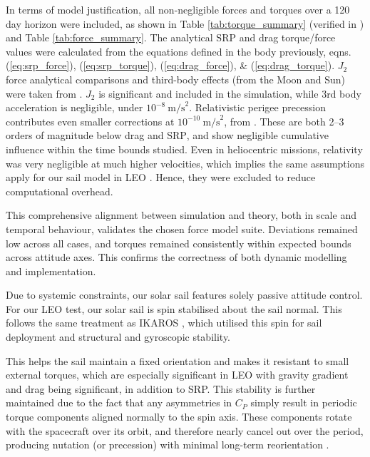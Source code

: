 \documentclass[final,3p,times,twocolumn]{elsarticle}
\begin{document}
\par\noindent In terms of model justification, all non-negligible forces and torques over a 120 day horizon were included, as shown in Table \ref{tab:torque_summary} (verified in \cite{torque_lit}) and Table \ref{tab:force_summary}. The analytical \( \text{SRP} \) and drag torque/force values were calculated from the equations defined in the body previously, eqns. (\ref{eq:srp_force}), (\ref{eq:srp_torque}), (\ref{eq:drag_force}), \& (\ref{eq:drag_torque}). \( J_2 \) force analytical comparisons and third-body effects (from the Moon and Sun) were taken from \cite{j2force}. \( J_2 \) is significant and included in the simulation, while 3rd body acceleration is negligible, under \(10^{-8}~\text{m/s}^2\). Relativistic perigee precession contributes even smaller corrections at \(10^{-10}~\text{m/s}^2\), from \cite{relativityforce}. These are both 2–3 orders of magnitude below drag and \( \text{SRP} \), and show negligible cumulative influence within the time bounds studied. Even in heliocentric missions, relativity was very negligible at much higher velocities, which implies the same assumptions apply for our sail model in LEO \citep{isss1}. Hence, they were excluded to reduce computational overhead.

\vspace{5pt}
\par\noindent This comprehensive alignment between simulation and theory, both in scale and temporal behaviour, validates the chosen force model suite. Deviations remained low across all cases, and torques remained consistently within expected bounds across attitude axes. This confirms the correctness of both dynamic modelling and implementation.

\vspace{5pt}
\par\noindent Due to systemic constraints, our solar sail features solely passive attitude control. For our LEO test, our solar sail is spin stabilised about the sail normal. This follows the same treatment as IKAROS \citep{tsuda2013achievement}, which utilised this spin for sail deployment and structural and gyroscopic stability.

\vspace{5pt}
\par\noindent \par\noindent This helps the sail maintain a fixed orientation and makes it resistant to small external torques, which are especially significant in LEO with gravity gradient and drag being significant, in addition to SRP. This stability is further maintained due to the fact that any asymmetries in \( C_P \) simply result in periodic torque components aligned normally to the spin axis. These components rotate with the spacecraft over its orbit, and therefore nearly cancel out over the period, producing nutation (or precession) with minimal long-term reorientation \citep{TimeAvg}.  
\end{document}
